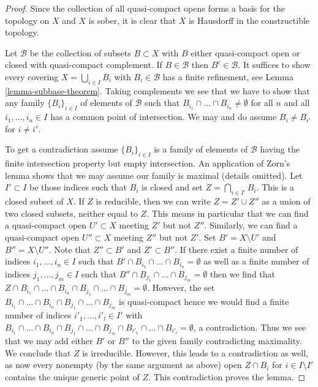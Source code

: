 \begin{proof}
Since the collection of all quasi-compact opens forms a basis for the
topology on $X$ and $X$ is sober, it is clear that $X$ is Hausdorff in
the constructible topology.

\medskip\noindent
Let $\mathcal{B}$ be the collection of subsets $B \subset X$
with $B$ either quasi-compact open or closed with quasi-compact
complement. If $B \in \mathcal{B}$ then $B^c \in \mathcal{B}$.
It suffices to show every covering $X = \bigcup_{i \in I} B_i$
with $B_i \in \mathcal{B}$ has a finite refinement, see
Lemma \ref{lemma-subbase-theorem}.
Taking complements we see that we have to show that any family
$\{B_i\}_{i \in I}$ of elements of $\mathcal{B}$
such that $B_{i_1} \cap \ldots \cap B_{i_n} \not = \emptyset$
for all $n$ and all $i_1, \ldots, i_n \in I$
has a common point of intersection. We may and do assume
$B_i \not = B_{i'}$ for $i \not = i'$.

\medskip\noindent
To get a contradiction assume $\{B_i\}_{i \in I}$ is a family
of elements of $\mathcal{B}$ having the finite intersection property
but empty intersection. An application of Zorn's lemma shows that we
may assume our family is maximal (details omitted).
Let $I' \subset I$ be those indices such that
$B_i$ is closed and set $Z = \bigcap_{i \in I'} B_i$. This is a closed
subset of $X$. If $Z$ is reducible, then we can write $Z = Z' \cup Z''$
as a union of two closed subsets, neither equal to $Z$. This means in
particular that we can find a quasi-compact open $U' \subset X$ meeting
$Z'$ but not $Z''$. Similarly, we can find a quasi-compact open
$U'' \subset X$ meeting $Z''$ but not $Z'$. Set $B' = X \setminus U'$ and
$B'' = X \setminus U''$. Note that $Z'' \subset B'$ and $Z' \subset B''$.
If there exist a finite number of indices $i_1, \ldots, i_n \in I$ such
that $B' \cap B_{i_1} \cap \ldots \cap B_{i_n} = \emptyset$
as well as a finite number of indices $j_1, \ldots, j_m \in I$ such that
$B'' \cap B_{j_1} \cap \ldots \cap B_{j_m} = \emptyset$
then we find that
$Z \cap B_{i_1} \cap \ldots \cap B_{i_n} \cap B_{j_1} \cap \ldots \cap B_{j_m}
= \emptyset$.
However, the set
$B_{i_1} \cap \ldots \cap B_{i_n} \cap B_{j_1} \cap \ldots \cap B_{j_m}$
is quasi-compact hence we would find a finite number of
indices $i'_1, \ldots, i'_l \in I'$ with
$B_{i_1} \cap \ldots \cap B_{i_n} \cap B_{j_1} \cap \ldots \cap
B_{j_m} \cap B_{i'_1} \cap \ldots \cap B_{i'_l} = \emptyset$, a contradiction.
Thus we see that we may add either $B'$ or $B''$ to the given family
contradicting maximality. We conclude that $Z$ is irreducible. However,
this leads to a contradiction as well, as now every nonempty (by the
same argument as above) open $Z \cap B_i$ for $i \in I \setminus I'$
contains the unique generic point of $Z$. This contradiction proves the lemma.
\end{proof}

